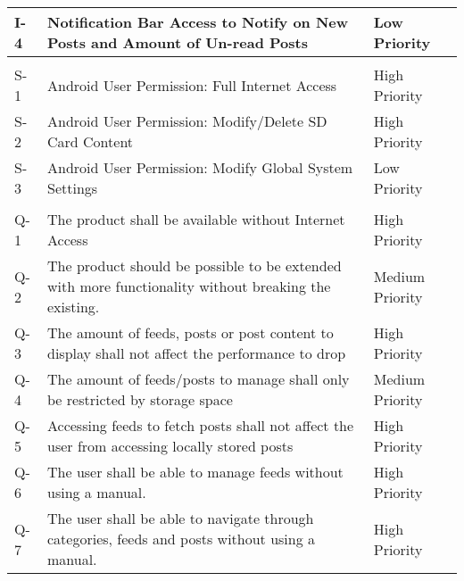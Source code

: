 \begin{center}
\begin{longtable}{ | l | p{8cm} | l | }
    I-4 & Notification Bar Access to Notify on New Posts and Amount of Un-read Posts & Low Priority \\ \hline
     &  &  \\ \hline
    S-1 & Android User Permission: Full Internet Access & High Priority \\ \hline
    S-2 & Android User Permission: Modify/Delete SD Card Content & High Priority \\ \hline
    S-3 & Android User Permission: Modify Global System Settings & Low Priority \\ \hline
     &  &  \\ \hline
    Q-1 & The product shall be available without Internet Access & High Priority \\ \hline
    Q-2 & The product should be possible to be extended with more functionality without breaking the existing. & Medium Priority \\ \hline
    Q-3 & The amount of feeds, posts or post content to display shall not affect the performance to drop & High Priority \\ \hline
    Q-4 & The amount of feeds/posts to manage shall only be restricted by storage space & Medium Priority \\ \hline
    Q-5 & Accessing feeds to fetch posts shall not affect the user from accessing locally stored posts & High Priority \\ \hline
    Q-6 & The user shall be able to manage feeds without using a manual. & High Priority \\ \hline
    Q-7 & The user shall be able to navigate through categories, feeds and posts without using a manual. & High Priority \\ \hline
 \hline
\end{longtable}
\end{center}